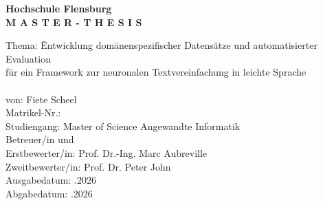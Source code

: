 \begin{center}
    \textbf{Hochschule Flensburg}\\
    \vspace{2cm}
    \textbf{\LARGE M A S T E R - T H E S I S}
\end{center}

\vspace{2cm}


\begin{tabbing}
    Thema: \hspace{2cm} \= Entwicklung domänenspezifischer Datensätze und automatisierter Evaluation\\
    \> für ein Framework zur neuronalen Textvereinfachung in leichte Sprache\\[0.5cm]
    \> \\[0.5cm]
    von: \> Fiete Scheel\\[2cm]
    Matrikel-Nr.: \> \\[0.5cm]
    Studiengang: \> Master of Science Angewandte Informatik \\[0.5cm]
    Betreuer/in und \\
    Erstbewerter/in: \> Prof. Dr.-Ing. Marc Aubreville \\[0.5cm]
    Zweitbewerter/in: \> Prof. Dr. Peter John \\[0.5cm]
    Ausgabedatum: .2026 \\[0.5cm]
    Abgabedatum: .2026
\end{tabbing}
